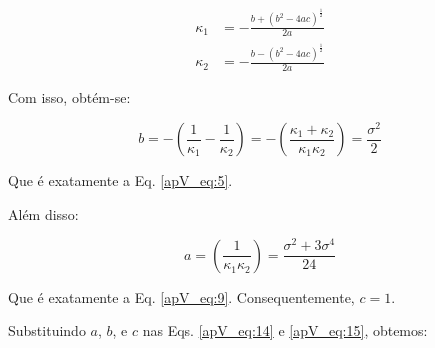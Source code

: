 \begin{align}
\label{apV_eq:14}
\kappa_{1} & = - \frac{b + (b^{2} - 4ac)^\frac{1}{2}}{2a} \\
\label{apV_eq:15}
\kappa_{2} & = - \frac{b - (b^{2} - 4ac)^\frac{1}{2}}{2a}
\end{align}

Com isso, obtém-se:

\begin{equation}
\label{apV_eq:16}
b = - \left( \frac{1}{\kappa_{1}} - \frac{1}{\kappa_{2}} \right) = - \left( \frac{\kappa_{1} + \kappa_{2}}{\kappa_{1}\kappa_{2}} \right) = \frac{\sigma^{2}}{2}
\end{equation}

Que é exatamente a Eq. \ref{apV_eq:5}.

Além disso:

\begin{equation}
\label{apV_eq:17}
a = \left( \frac{1}{\kappa_{1}\kappa_{2}} \right) = \frac{\sigma^{2} + 3\sigma^{4}}{24}
\end{equation}

Que é exatamente a Eq. \ref{apV_eq:9}. Consequentemente, $c = 1$.

Substituindo $a$, $b$, e $c$ nas Eqs. \ref{apV_eq:14} e \ref{apV_eq:15}, obtemos:






